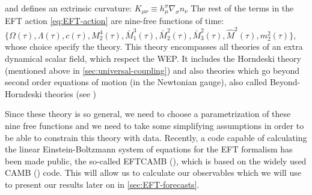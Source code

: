and defines an extrinsic curvature:
\beeqp$
K_{\mu \nu} \equiv h^{\sigma}_{\mu} \nabla_{\sigma} n_\nu
$
The rest of the terms in the EFT action \cref{eq:EFT-action} are nine-free functions of time:\\
$\{\Omega(\tau), \Lambda(\tau), c(\tau), M_{2}^4 (\tau), \bar{M}_{1}^3 (\tau), \bar{M}_2^2 (\tau), \bar{M}_3^2 (\tau),
 \hat{M}^2 (\tau), m^2_2(\tau)\}$, whose choice specify the theory.
This theory encompasses all theories of an extra dynamical scalar field, which respect the WEP.
It includes the Horndeski theory (mentioned above in \cref{sec:universal-coupling}) 
and also theories which go beyond second order equations of motion (in the Newtonian gauge), also called
Beyond-Horndeski theories (see \cite{Gleyzes2016, Piazza, Bellini})

Since these theory is so general, we need to choose a parametrization of these nine free functions and 
we need to take some simplifying assumptions in order to be able to constrain this theory with data.
Recently, a code capable of calculating the linear Einstein-Boltzmann system of equations for the EFT formalism
has been made public, the so-called \textsc{EFTCAMB} (\cite{Hu, Raveri, Silvestri}), which is based 
on the widely used \textsc{CAMB} (\cite{lewis_efficient_2000}) code. 
This will allow us to calculate our observables which we will 
use to present our results later on in \cref{sec:EFT-forecasts}.


